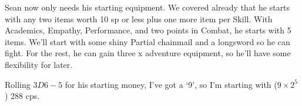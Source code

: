   \begin{exampletext}

    Sean now only needs his starting equipment.
    We covered already that he starts with any two items worth 10 \gls{sp} or less plus one more item per Skill.
    With Academics, Empathy, Performance, and two points in Combat, he starts with 5 items.
    We'll start with some shiny Partial chainmail and a longsword so he can fight.
    For the rest, he can gain three x \gls{adventure} equipment, so he'll have some flexibility for later.

  Rolling $3D6-5$ for his starting money, I've got a `9', so I'm starting with ($9\times 2^5$) 288 \glspl{cp}.

\end{exampletext}
